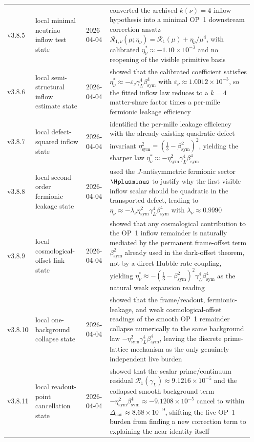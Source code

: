 {\begin{longtable}{|p{}|p{}|p{}|p{}|}
v3.8.5 & local minimal neutrino-inflow test state & 2026-04-04 & converted the archived \(k(\nu)=4\) inflow hypothesis into a minimal OP~1 downstream correction ansatz \(\mathcal R_{1,\nu}(\mu;\eta_\nu)=\mathcal R_1(\mu)+\eta_\nu/\mu^4\), with calibrated \(\eta_\nu^\ast\approx -1.10\times10^{-3}\) and no reopening of the visible primitive basis \\
v3.8.6 & local semi-structural inflow estimate state & 2026-04-04 & showed that the calibrated coefficient satisfies \(\eta_\nu^\ast\approx -\varepsilon_\nu\gamma_L^4\beta_{\mathrm{sym}}^4\) with \(\varepsilon_\nu\approx 1.0012\times10^{-3}\), so the fitted inflow law reduces to a \(k=4\) matter-share factor times a per-mille fermionic leakage efficiency \\
v3.8.7 & local defect-squared inflow state & 2026-04-04 & identified the per-mille leakage efficiency with the already existing quadratic defect invariant \(\eta_{\mathrm{sym}}^2=(\frac13-\beta_{\mathrm{sym}}^2)^2\), yielding the sharper law \(\eta_\nu^\ast\approx -\eta_{\mathrm{sym}}^2\gamma_L^4\beta_{\mathrm{sym}}^4\) \\
v3.8.8 & local second-order fermionic leakage state & 2026-04-04 & used the \(J\)-antisymmetric fermionic sector \(\Hplusminus\) to justify why the first visible inflow scalar should be quadratic in the transported defect, leading to \(\eta_\nu\approx -\lambda_\nu\eta_{\mathrm{sym}}^2\gamma_L^4\beta_{\mathrm{sym}}^4\) with \(\lambda_\nu\approx 0.9990\) \\
v3.8.9 & local cosmological-offset link state & 2026-04-04 & showed that any cosmological contribution to the OP~1 inflow remainder is naturally mediated by the permanent frame-offset term \(\beta_{\mathrm{sym}}^2\) already used in the dark-offset theorem, not by a direct Hubble-rate coupling, yielding \(\eta_\nu^\ast\approx -(\frac13-\beta_{\mathrm{sym}}^2)^2\gamma_L^4\beta_{\mathrm{sym}}^4\) as the natural weak expansion reading \\
v3.8.10 & local one-background collapse state & 2026-04-04 & showed that the frame/readout, fermionic-leakage, and weak cosmological-offset readings of the smooth OP~1 remainder collapse numerically to the same background law \(-\eta_{\mathrm{sym}}^2\gamma_L^4\beta_{\mathrm{sym}}^4\), leaving the discrete prime-lattice mechanism as the only genuinely independent live burden \\
v3.8.11 & local readout-point cancellation state & 2026-04-04 & showed that the scalar prime/continuum residual \(\mathcal R_1(\gamma_L)\approx 9.1216\times10^{-5}\) and the collapsed smooth background term \(-\eta_{\mathrm{sym}}^2\beta_{\mathrm{sym}}^4\approx -9.1208\times10^{-5}\) cancel to within \(\Delta_{\mathrm{can}}\approx 8.68\times10^{-9}\), shifting the live OP~1 burden from finding a new correction term to explaining the near-identity itself \\

\end{longtable}}
